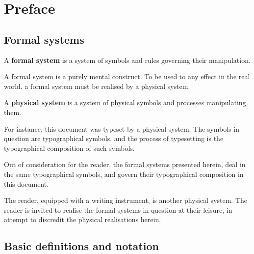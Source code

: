 
\chapter{Preface}


\section{Formal systems}

\begin{notion}

A \textbf{formal system} is a system of symbols and rules governing their
manipulation.

\end{notion}

A formal system is a purely mental construct. To be used to any effect in the
real world, a formal system must be realised by a physical system.

\begin{notion}

A \textbf{physical system} is a system of physical symbols and processes
manipulating them. 

\end{notion}

For instance, this document was typeset by a physical system. The symbols in
question are typographical symbols, and the process of typesetting is the
typographical composition of such symbols.

Out of consideration for the reader, the formal systems presented herein, deal
in the same typographical symbols, and govern their typographical composition
in this document.

The reader, equipped with a writing instrument, is another physical system. The
reader is invited to realise the formal systems in question at their leisure,
in attempt to discredit the physical realisations herein.

\section{Basic definitions and notation}

